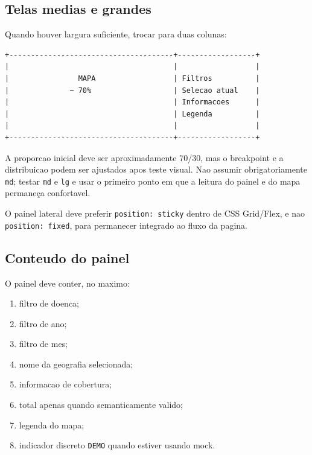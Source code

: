 \documentclass[12pt,a4paper]{article}
\begin{document}
\subsection{Telas medias e grandes}

Quando houver largura suficiente, trocar para duas colunas:

\begin{lstlisting}
+--------------------------------------+------------------+
|                                      |                  |
|                MAPA                  | Filtros          |
|              ~ 70%                   | Selecao atual    |
|                                      | Informacoes      |
|                                      | Legenda          |
|                                      |                  |
+--------------------------------------+------------------+
\end{lstlisting}

A proporcao inicial deve ser aproximadamente 70/30, mas o breakpoint e a distribuicao podem ser ajustados apos teste visual. Nao assumir obrigatoriamente \texttt{md}; testar \texttt{md} e \texttt{lg} e usar o primeiro ponto em que a leitura do painel e do mapa permaneça confortavel.

O painel lateral deve preferir \texttt{position: sticky} dentro de CSS Grid/Flex, e nao \texttt{position: fixed}, para permanecer integrado ao fluxo da pagina.

\subsection{Conteudo do painel}

O painel deve conter, no maximo:

\begin{enumerate}[leftmargin=*]
    \item filtro de doenca;
    \item filtro de ano;
    \item filtro de mes;
    \item nome da geografia selecionada;
    \item informacao de cobertura;
    \item total apenas quando semanticamente valido;
    \item legenda do mapa;
    \item indicador discreto \texttt{DEMO} quando estiver usando mock.
\end{enumerate}
\end{document}
